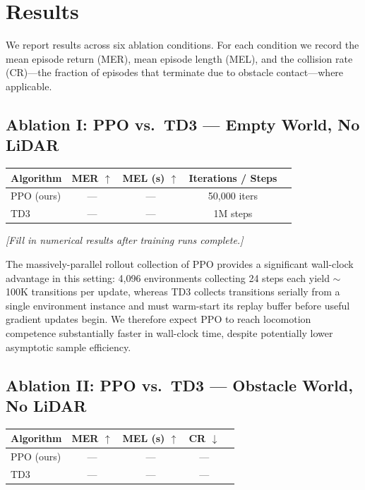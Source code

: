 \documentclass{article}
\begin{document}
\section{Results}

We report results across six ablation conditions.
For each condition we record the mean episode return (MER), mean episode
length (MEL), and the collision rate (CR)—the fraction of episodes that
terminate due to obstacle contact—where applicable.

\subsection{Ablation I: PPO vs.\ TD3 — Empty World, No LiDAR}

\begin{center}
\begin{tabular}{lcccc}
  \toprule
  \textbf{Algorithm} & \textbf{MER} $\uparrow$ & \textbf{MEL (s)} $\uparrow$
    & \textbf{Iterations / Steps} \\
  \midrule
  PPO (ours) & --- & --- & 50{,}000 iters \\
  TD3         & --- & --- & 1M steps \\
  \bottomrule
\end{tabular}
\end{center}

\textit{[Fill in numerical results after training runs complete.]}

The massively-parallel rollout collection of PPO provides a significant
wall-clock advantage in this setting: 4{,}096 environments collecting 24
steps each yield $\sim$100K transitions per update, whereas TD3 collects
transitions serially from a single environment instance and must warm-start
its replay buffer before useful gradient updates begin.
We therefore expect PPO to reach locomotion competence substantially faster
in wall-clock time, despite potentially lower asymptotic sample efficiency.

\subsection{Ablation II: PPO vs.\ TD3 — Obstacle World, No LiDAR}

\begin{center}
\begin{tabular}{lcccc}
  \toprule
  \textbf{Algorithm} & \textbf{MER} $\uparrow$ & \textbf{MEL (s)} $\uparrow$
    & \textbf{CR} $\downarrow$ \\
  \midrule
  PPO (ours) & --- & --- & --- \\
  TD3         & --- & --- & --- \\
  \bottomrule
\end{tabular}
\end{center}
\end{document}
